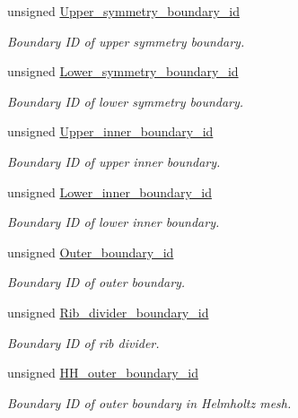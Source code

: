 \begin{DoxyCompactItemize}
unsigned \hyperlink{classCoatedSphereProblem_add071e3a8d3159b181b31559ca233408}{Upper\+\_\+symmetry\+\_\+boundary\+\_\+id}
\begin{DoxyCompactList}\small\item\em Boundary ID of upper symmetry boundary. \end{DoxyCompactList}\item 
unsigned \hyperlink{classCoatedSphereProblem_a9bfac78ea8fcd9d1fc4844e9db66c0d1}{Lower\+\_\+symmetry\+\_\+boundary\+\_\+id}
\begin{DoxyCompactList}\small\item\em Boundary ID of lower symmetry boundary. \end{DoxyCompactList}\item 
unsigned \hyperlink{classCoatedSphereProblem_abdd54d39d9757a4da7d2eb56bab1c392}{Upper\+\_\+inner\+\_\+boundary\+\_\+id}
\begin{DoxyCompactList}\small\item\em Boundary ID of upper inner boundary. \end{DoxyCompactList}\item 
unsigned \hyperlink{classCoatedSphereProblem_ac5b9684155899ef6c43d73c1dbffc076}{Lower\+\_\+inner\+\_\+boundary\+\_\+id}
\begin{DoxyCompactList}\small\item\em Boundary ID of lower inner boundary. \end{DoxyCompactList}\item 
unsigned \hyperlink{classCoatedSphereProblem_abf88cdcfd5fe2e91dde565ef0801ed47}{Outer\+\_\+boundary\+\_\+id}
\begin{DoxyCompactList}\small\item\em Boundary ID of outer boundary. \end{DoxyCompactList}\item 
unsigned \hyperlink{classCoatedSphereProblem_a4eeb21412dc4a62d33c03048286fb4b6}{Rib\+\_\+divider\+\_\+boundary\+\_\+id}
\begin{DoxyCompactList}\small\item\em Boundary ID of rib divider. \end{DoxyCompactList}\item 
unsigned \hyperlink{classCoatedSphereProblem_a7462cad0a109f08ee2dcff2b45bff9bc}{H\+H\+\_\+outer\+\_\+boundary\+\_\+id}
\begin{DoxyCompactList}\small\item\em Boundary ID of outer boundary in Helmholtz mesh. \end{DoxyCompactList}\item 

\end{DoxyCompactItemize}
